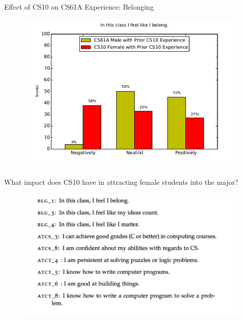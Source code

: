 \documentclass{beamer}                  %
\begin{document}
\begin{frame}{Effect of CS10 on CS61A Experience: Belonging}

  \begin{figure}[!htbp]
      \centering 
      \includegraphics[width=1\textwidth]{blg_1_worstCaseScenario}
  \end{figure}

\end{frame}


\begin{frame}{What impact does CS10 have in attracting female students into the major?}

  \begin{figure}[!htbp]
      \centering
      \includegraphics[width=1\textwidth]{BLG-ATCT}
      
  \end{figure}

\end{frame}
\end{document}
